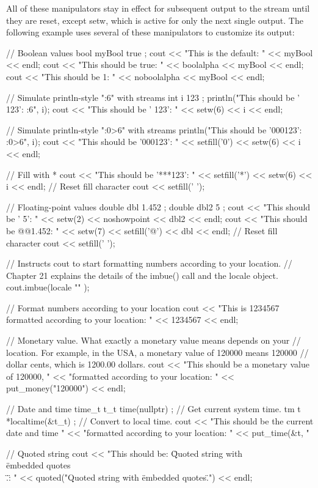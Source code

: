 All of these manipulators stay in effect for subsequent output to the stream until they are reset, except setw, which is active for only the next single output. The following example uses several of these manipulators to customize its output:

\begin{cpp}
// Boolean values
bool myBool { true };
cout << "This is the default: " << myBool << endl;
cout << "This should be true: " << boolalpha << myBool << endl;
cout << "This should be 1: " << noboolalpha << myBool << endl;

// Simulate println-style "{:6}" with streams
int i { 123 };
println("This should be ' 123': {:6}", i);
cout << "This should be ' 123': " << setw(6) << i << endl;

// Simulate println-style "{:0>6}" with streams
println("This should be '000123': {:0>6}", i);
cout << "This should be '000123': " << setfill('0') << setw(6) << i << endl;

// Fill with *
cout << "This should be '***123': " << setfill('*') << setw(6) << i << endl;
// Reset fill character
cout << setfill(' ');

// Floating-point values
double dbl { 1.452 };
double dbl2 { 5 };
cout << "This should be ' 5': " << setw(2) << noshowpoint << dbl2 << endl;
cout << "This should be @@1.452: " << setw(7) << setfill('@') << dbl << endl;
// Reset fill character
cout << setfill(' ');

// Instructs cout to start formatting numbers according to your location.
// Chapter 21 explains the details of the imbue() call and the locale object.
cout.imbue(locale { "" });

// Format numbers according to your location
cout << "This is 1234567 formatted according to your location: " << 1234567
     << endl;

// Monetary value. What exactly a monetary value means depends on your
// location. For example, in the USA, a monetary value of 120000 means 120000
// dollar cents, which is 1200.00 dollars.
cout << "This should be a monetary value of 120000, "
     << "formatted according to your location: "
     << put_money("120000") << endl;

// Date and time
time_t t_t { time(nullptr) }; // Get current system time.
tm t { *localtime(&t_t) }; // Convert to local time.
cout << "This should be the current date and time "
     << "formatted according to your location: "
     << put_time(&t, "%

// Quoted string
cout << "This should be: \"Quoted string with \\\"embedded quotes\\\".\": "
     << quoted("Quoted string with \"embedded quotes\".") << endl;
\end{cpp}

